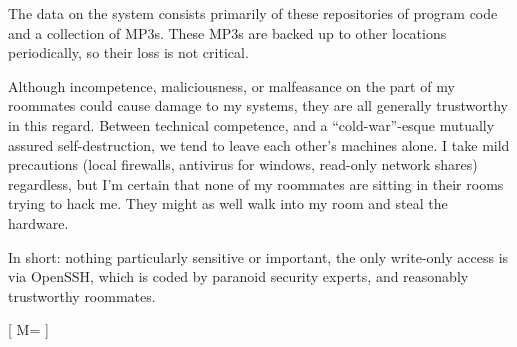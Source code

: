 \documentclass[11pt]{article}
\begin{document}
The data on the system consists primarily of these repositories of 
program code and a collection of MP3s.  
These MP3s are backed up to other locations periodically, so their loss is not
critical. 

Although incompetence, maliciousness, or malfeasance on the part of my 
roommates could cause damage to my systems, they are all generally trustworthy
in this regard.  Between technical competence, and a ``cold-war''\--esque 
mutually assured self-destruction, we tend to leave each other's machines 
alone.  I take mild precautions (local firewalls, antivirus for windows,
read\--only network shares) regardless, but I'm certain that none of my 
roommates are sitting in their rooms trying to hack me.  They might as well
walk into my room and steal the hardware.

In short: nothing particularly sensitive or important,
the only write-only access is via OpenSSH, which is coded by paranoid 
security experts, and reasonably trustworthy roommates.

[
   M=
  \left[ {\begin{array}{cc}
   1 & 2 \       3 & 4 \      \end{array} } \right]
]
\end{document}
